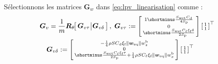 \begin{algorithm}                     
    \begin{algorithmic} [1]           
        \State Sélectionnons les matrices $\boldsymbol{G}_w$ dans \eqref{eq:lpv_linearisation} comme : 
        \begin{align}
        \nonumber
        & \boldsymbol{G}_{v} = \frac{1}{m}    \boldsymbol{R}_\theta \!\! \left[ \!\! \begin{array}{c|c} 
            \boldsymbol{G}_{v\tau}\!\! & \! \! \boldsymbol{G}_{v\delta} 
            \end{array} \!\! \right], \; \boldsymbol{G}_{v\tau} :=      \smallmat{
        1 \shortminus \frac{S_{\text{wet}} C_{\text{d}}}{4S_{\text{p}}}\\ 0 \\ \shortminus\frac{S_{\text{wet}} C_{\ell} \xi_{\text{f}}\delta}{2S_{\text{p}}} } \smallmat{ 1 \\ 1}^\top                     \\
        \label{eq:Gv_ALG_luca}
        &\quad  \boldsymbol{G}_{v\delta} := 
        \smallmat{
                -   \frac{1}{4}\rho S C_{\text{d}} \xi_{\text{f}} \lVert \boldsymbol{w}_{\text{eq}} \rVert w^{\text{b}}_{z}\\0 \\\shortminus \frac{S_{\text{wet}}  C_{\ell} \xi_{\text{f}}\tau}{2S_{\text{p}}} + \frac{1}{4}\rho S C_{\ell}  \xi_{\text{f}} \lVert \boldsymbol{w}_{\text{eq}} \rVert w^{\text{b}}_{x}
            } \smallmat{ 1 \\ 1}^\top 
        \end{align}


\end{algorithmic}
\end{algorithm}
